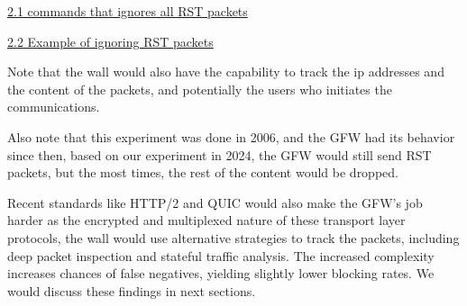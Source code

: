 \documentclass[sigconf]{acmart}
\begin{document}
\href{}{2.1 commands that ignores all RST packets}

\begin{Shaded}
\begin{Highlighting}[]
\end{Highlighting}
\end{Shaded}

\href{}{2.2 Example of ignoring RST packets}

Note that the wall would also have the capability to track the ip
addresses and the content of the packets, and potentially the users who
initiates the communications.

Also note that this experiment was done in 2006, and the GFW had its
behavior since then, based on our experiment in 2024, the GFW would
still send RST packets, but the most times, the rest of the content
would be dropped.

Recent standards like HTTP/2 and QUIC would also make the GFW's job
harder as the encrypted and multiplexed nature of these transport layer
protocols, the wall would use alternative strategies to track the
packets, including deep packet inspection and stateful traffic analysis.
The increased complexity increases chances of false negatives, yielding
slightly lower blocking rates. We would discuss these findings in next
sections.
\end{document}
